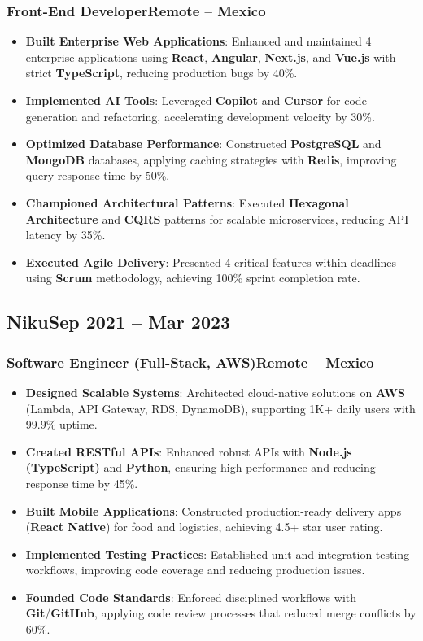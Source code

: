 \documentclass[a4paper,10pt]{article}
\newcommand{\kw}[1]{\textbf{\textcolor{keyword}{#1}}}
\newcommand{\tech}[1]{\textbf{\textcolor{tech}{#1}}}
\begin{document}
\subsubsection*{\small Front-End Developer\hfill Remote -- Mexico}
\begin{itemize}[noitemsep, leftmargin=*]
    \item \textbf{Built Enterprise Web Applications}: Enhanced and maintained 4 enterprise applications using \tech{React}, \tech{Angular}, \tech{Next.js}, and \tech{Vue.js} with strict \tech{TypeScript}, reducing production bugs by 40\%.
    \item \textbf{Implemented AI Tools}: Leveraged \kw{Copilot} and \kw{Cursor} for code generation and refactoring, accelerating development velocity by 30\%.
    \item \textbf{Optimized Database Performance}: Constructed \kw{PostgreSQL} and \kw{MongoDB} databases, applying caching strategies with \tech{Redis}, improving query response time by 50\%.
    \item \textbf{Championed Architectural Patterns}: Executed \kw{Hexagonal Architecture} and \kw{CQRS} patterns for scalable microservices, reducing API latency by 35\%.
    \item \textbf{Executed Agile Delivery}: Presented 4 critical features within deadlines using \kw{Scrum} methodology, achieving 100\% sprint completion rate.
\end{itemize}

\subsection*{\small Niku\hfill\textbf{Sep 2021 -- Mar 2023}}
\subsubsection*{\small Software Engineer (Full-Stack, AWS)\hfill Remote -- Mexico}
\begin{itemize}[noitemsep, leftmargin=*]
    \item \textbf{Designed Scalable Systems}: Architected cloud-native solutions on \tech{AWS} (Lambda, API Gateway, RDS, DynamoDB), supporting 1K+ daily users with 99.9\% uptime.
    \item \textbf{Created RESTful APIs}: Enhanced robust APIs with \tech{Node.js (TypeScript)} and \tech{Python}, ensuring high performance and reducing response time by 45\%.
    \item \textbf{Built Mobile Applications}: Constructed production-ready delivery apps (\tech{React Native}) for food and logistics, achieving 4.5+ star user rating.
    \item \textbf{Implemented Testing Practices}: Established unit and integration testing workflows, improving code coverage and reducing production issues.
    \item \textbf{Founded Code Standards}: Enforced disciplined workflows with \tech{Git}/\tech{GitHub}, applying code review processes that reduced merge conflicts by 60\%.
\end{itemize}
\end{document}
